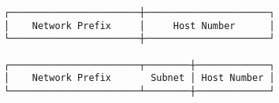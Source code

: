 \documentclass[varwidth,crop]{standalone}
\begin{document}
\begin{verbatim}
┌───────────────────────┼──────────────────────┐
│    Network Prefix     │     Host Number      │
└───────────────────────┼──────────────────────┘

┌───────────────────────┬────────┼─────────────┐
│    Network Prefix       Subnet │ Host Number │
└───────────────────────┴────────┼─────────────┘
\end{verbatim}
\end{document}
